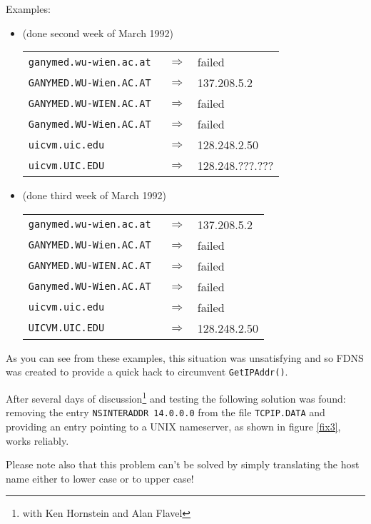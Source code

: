 \noindent  Examples:\\
\begin{itemize}
\item (done second week of March 1992)\\
\begin{tabular}{|lcl|}\hline
  {\tt   ganymed.wu-wien.ac.at } & $\Longrightarrow$ & failed \\
  {\tt   GANYMED.WU-Wien.AC.AT } & $\Longrightarrow$ & 137.208.5.2 \\
  {\tt   GANYMED.WU-WIEN.AC.AT } & $\Longrightarrow$ & failed \\
  {\tt   Ganymed.WU-Wien.AC.AT } & $\Longrightarrow$ & failed \\
  {\tt   uicvm.uic.edu         } & $\Longrightarrow$ & 128.248.2.50 \\
  {\tt   uicvm.UIC.EDU         } & $\Longrightarrow$ & 128.248.???.??? \\
\hline\end{tabular}

\item (done third week of March 1992)\\
\begin{tabular}{|lcl|}\hline
  {\tt   ganymed.wu-wien.ac.at } & $\Longrightarrow$ & 137.208.5.2 \\
  {\tt   GANYMED.WU-Wien.AC.AT } & $\Longrightarrow$ & failed \\
  {\tt   GANYMED.WU-WIEN.AC.AT } & $\Longrightarrow$ & failed \\
  {\tt   Ganymed.WU-Wien.AC.AT } & $\Longrightarrow$ & failed \\
  {\tt   uicvm.uic.edu         } & $\Longrightarrow$ & failed \\
  {\tt   UICVM.UIC.EDU         } & $\Longrightarrow$ & 128.248.2.50 \\
\hline\end{tabular}
\end{itemize}
 
  As you can see from these examples, this situation was unsatisfying and
  so FDNS was created to provide a quick hack to
  circumvent {\tt GetIPAddr()}.
 
  After several days of discussion\footnote{with Ken Hornstein and
  Alan Flavel} and testing the following solution
  was found:  removing the entry {\tt NSINTERADDR 14.0.0.0} from the file
  {\tt TCPIP.DATA} and providing an entry pointing to a UNIX nameserver,
  as shown in figure \ref{fix3}, works reliably.
 
  Please note also that this problem can't be solved by simply
  translating the host name either to lower case or to upper case!
 

